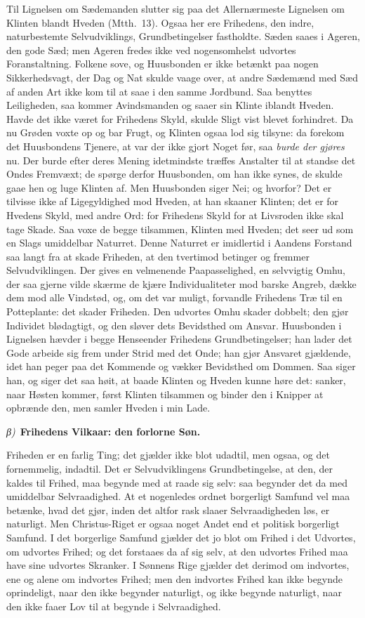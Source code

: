 \documentclass[12pt]{book}
\newcommand{\greekrun}[2]{%
  \medskip\begin{center}{\itshape #1)}\ {\bfseries #2}\end{center}\medskip}
\begin{document}
Til Lignelsen om Sædemanden slutter sig paa det Allernærmeste
Lignelsen om Klinten blandt Hveden (Mtth.\ 13). Ogsaa her ere
Frihedens, den indre, naturbestemte Selvudviklings, Grundbetingelser
fastholdte. Sæden saaes i Ageren, den gode Sæd; men Ageren fredes
ikke ved nogensomhelst udvortes Foranstaltning. Folkene sove, og
Huusbonden er ikke betænkt paa nogen Sikkerhedsvagt, der Dag og Nat
skulde vaage over, at andre Sædemænd med Sæd af anden Art ikke kom
til at saae i den samme Jordbund. Saa benyttes Leiligheden,
saa kommer Avindsmanden og saaer sin Klinte iblandt Hveden. Havde
det ikke været for Frihedens Skyld, skulde Sligt vist blevet
forhindret. Da nu Grøden voxte op og bar Frugt, og Klinten ogsaa lod
sig tilsyne: da forekom det Huusbondens Tjenere, at var der ikke
gjort Noget før, saa \emph{burde der gjøres} nu. Der burde efter
deres Mening idetmindste træffes Anstalter til at standse det Ondes
Fremvæxt; de spørge derfor Huusbonden, om han ikke synes, de skulde
gaae hen og luge Klinten af. Men Huusbonden siger Nei; og hvorfor?
Det er tilvisse ikke af Ligegyldighed mod Hveden, at han skaaner
Klinten; det er for Hvedens Skyld, med andre Ord: for Frihedens
Skyld for at Livsroden ikke skal tage Skade. Saa voxe de begge
tilsammen, Klinten med Hveden; det seer ud som en Slags umiddelbar
Naturret. Denne Naturret er imidlertid i Aandens Forstand saa langt
fra at skade Friheden, at den tvertimod betinger og fremmer
Selvudviklingen. Der gives en velmenende Paapasselighed, en
selvvigtig Omhu, der saa gjerne vilde skærme de kjære
Individualiteter mod barske Angreb, dække dem mod alle Vindstød, og,
om det var muligt, forvandle Frihedens Træ til en Potteplante: det
skader Friheden. Den udvortes Omhu skader dobbelt; den gjør Individet
blødagtigt, og den sløver dets Bevidsthed om Ansvar. Huusbonden i
Lignelsen hævder i begge Henseender Frihedens Grundbetingelser; han
lader det Gode arbeide sig frem under Strid med det Onde; han gjør
Ansvaret gjældende, idet han peger paa det Kommende og vækker
Bevidsthed om Dommen. Saa siger han, og siger det saa høit, at baade
Klinten og Hveden kunne høre det: sanker, naar Høsten kommer, først
Klinten tilsammen og binder den i Knipper at opbrænde den, men
samler Hveden i min Lade.

\greekrun{β}{Frihedens Vilkaar: den forlorne Søn.}

Friheden er en farlig Ting; det gjælder ikke blot udadtil, men
ogsaa, og det fornemmelig, indadtil. Det er Selvudviklingens
Grundbetingelse, at den, der kaldes til Frihed, maa begynde med at
raade sig selv: saa begynder det da med umiddelbar Selvraadighed. At
et nogenledes ordnet borgerligt Samfund vel maa betænke, hvad det
gjør, inden det altfor rask slaaer Selvraadigheden løs, er
naturligt. Men Christus-Riget er ogsaa noget Andet end et politisk
borgerligt Samfund. I det borgerlige Samfund gjælder det jo blot om
Frihed i det Udvortes, om udvortes Frihed; og det forstaaes da af
sig selv, at den udvortes Frihed maa have sine udvortes Skranker. I
Sønnens Rige gjælder det derimod om indvortes, ene og alene om
indvortes Frihed; men den indvortes Frihed kan ikke begynde
oprindeligt, naar den ikke begynder naturligt, og ikke begynde
naturligt, naar den ikke faaer Lov til at begynde i Selvraadighed.
\end{document}
